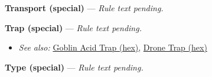 \documentclass[a4paper,12pt]{article}
\begin{document}
\label{rule-special-transport}%
\noindent\textbf{Transport (special)} --- \textit{Rule text pending.}

\label{rule-special-trap}%
\noindent\textbf{Trap (special)} --- \textit{Rule text pending.}\begin{itemize}
\item \textit{See also:} \hyperref[rule-hex-goblin-acid-trap]{Goblin Acid Trap (hex)}, \hyperref[rule-hex-drone-trap]{Drone Trap (hex)}
\end{itemize}


\label{rule-special-type}%
\noindent\textbf{Type (special)} --- \textit{Rule text pending.}
\end{document}
